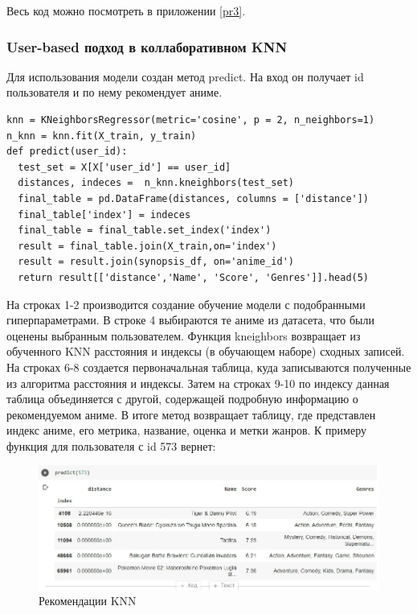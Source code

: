 \documentclass[bachelor, och, diploma]{SCWorks}
\begin{document}
Весь код можно посмотреть в приложении \ref{pr3}.


\subsubsection{User-based подход в коллаборативном KNN}
Для использования модели создан метод predict. На вход он получает id пользователя и по нему рекомендует аниме. 

\begin{verbatim}
knn = KNeighborsRegressor(metric='cosine', p = 2, n_neighbors=1)
n_knn = knn.fit(X_train, y_train)
def predict(user_id):
  test_set = X[X['user_id'] == user_id]
  distances, indeces =  n_knn.kneighbors(test_set)
  final_table = pd.DataFrame(distances, columns = ['distance'])
  final_table['index'] = indeces
  final_table = final_table.set_index('index')
  result = final_table.join(X_train,on='index')
  result = result.join(synopsis_df, on='anime_id')
  return result[['distance','Name', 'Score', 'Genres']].head(5)
\end{verbatim}

На строках 1-2 производится создание обучение модели с подобранными гиперпараметрами. В строке 4 выбираются те аниме из датасета, что были оценены выбранным пользователем. Функция kneighbors возвращает из обученного KNN расстояния и индексы (в обучающем наборе) сходных записей. На строках 6-8 создается первоначальная таблица, куда записываются полученные из алгоритма расстояния и индексы.
 Затем на строках 9-10 по индексу данная таблица объединяется с другой, 
 содержащей подробную информацию о рекомендуемом аниме.
  В итоге метод возвращает таблицу, где представлен индекс аниме,
   его метрика, название, оценка и метки жанров. К примеру функция для пользователя с id 573 вернет:

   \begin{figure}[h]

	\centering
	
	\includegraphics[width=0.8\linewidth]{res2.png}
	
	\caption{Рекомендации KNN}
	
	\label{fig:r2}
	
\end{figure}
\end{document}
